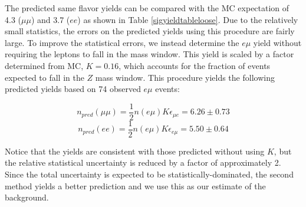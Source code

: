 The predicted same flavor \ttbar yields 
can be compared 
with the MC expectation of 
4.3 %
($\mu\mu$) and 
3.7 %
($ee$) as shown in Table \ref{sigyieldtableloose}.
Due to the relatively small statistics, the errors on the predicted yields 
using this procedure are fairly large.
To improve the statistical errors, we instead determine the $e\mu$ yield
without requiring the leptons to fall in the \Z mass window. 
This yield is scaled by a factor determined from MC, $K= 0.16$, %
which accounts for the fraction of \ttbar events expected to fall in the $Z$ mass
window. This procedure yields the following
predicted yields based on 74 observed $e\mu$ events: %

\begin{equation}
n_{pred}(\mu\mu) = \frac{1}{2}n(e\mu)K\epsilon_{\mu e} = 6.26 \pm 0.73
\end{equation}
\begin{equation}
n_{pred}(ee)     = \frac{1}{2}n(e\mu)K\epsilon_{e\mu} = 5.50 \pm 0.64
\end{equation}

Notice that the yields are consistent with those predicted without using $K$, but the relative statistical uncertainty is reduced by a factor of approximately 2.
Since the total uncertainty is expected to be statistically-dominated, the second method yields a better prediction and we use this as our estimate
of the \ttbar background. 



